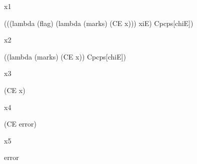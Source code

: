 \noindent
x1

\begin{schemeblock}
\begin{schemedisplay}
(((lambda (flag)
    (lambda (marks)
      (CE x)))
  xiE) Cpcps[chiE])
\end{schemedisplay}
\end{schemeblock}

\noindent
x2

\begin{schemeblock}
\begin{schemedisplay}
((lambda (marks)
   (CE x))
 Cpcps[chiE])
\end{schemedisplay}
\end{schemeblock}

\noindent
x3

\begin{schemeblock}
\begin{schemedisplay}
(CE x)
\end{schemedisplay}
\end{schemeblock}

\noindent
x4

\begin{schemeblock}
\begin{schemedisplay}
(CE error)
\end{schemedisplay}
\end{schemeblock}

\noindent
x5

\begin{schemeblock}
\begin{schemedisplay}
error
\end{schemedisplay}
\end{schemeblock}

